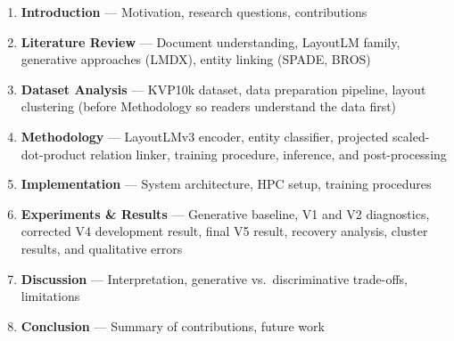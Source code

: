 \documentclass[11pt,a4paper]{article}
\begin{document}
\begin{enumerate}[nosep]
  \item \textbf{Introduction} --- Motivation, research questions, contributions
  \item \textbf{Literature Review} --- Document understanding, LayoutLM family, generative approaches (LMDX), entity linking (SPADE, BROS)
  \item \textbf{Dataset Analysis} --- KVP10k dataset, data preparation pipeline, layout clustering (before Methodology so readers understand the data first)
  \item \textbf{Methodology} --- LayoutLMv3 encoder, entity classifier, projected scaled-dot-product relation linker, training procedure, inference, and post-processing
  \item \textbf{Implementation} --- System architecture, HPC setup, training procedures
  \item \textbf{Experiments \& Results} --- Generative baseline, V1 and V2 diagnostics, corrected V4 development result, final V5 result, recovery analysis, cluster results, and qualitative errors
  \item \textbf{Discussion} --- Interpretation, generative vs.\ discriminative trade-offs, limitations
  \item \textbf{Conclusion} --- Summary of contributions, future work
\end{enumerate}
\end{document}
